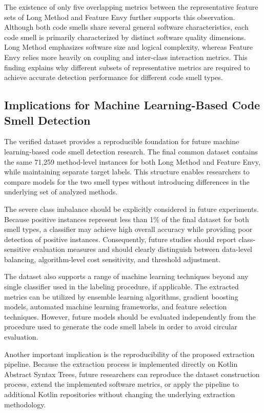 \documentclass[]{einformatica}
\begin{document}
The existence of only five overlapping metrics between the representative feature sets of Long Method and Feature Envy further supports this observation. Although both code smells share several general software characteristics, each code smell is primarily characterized by distinct software quality dimensions. Long Method emphasizes software size and logical complexity, whereas Feature Envy relies more heavily on coupling and inter-class interaction metrics. This finding explains why different subsets of representative metrics are required to achieve accurate detection performance for different code smell types.

\subsection{Implications for Machine Learning-Based Code Smell Detection}

The verified dataset provides a reproducible foundation for future machine learning-based code smell detection research. The final common dataset contains the same 71,259 method-level instances for both Long Method and Feature Envy, while maintaining separate target labels. This structure enables researchers to compare models for the two smell types without introducing differences in the underlying set of analyzed methods.

The severe class imbalance should be explicitly considered in future experiments. Because positive instances represent less than 1\% of the final dataset for both smell types, a classifier may achieve high overall accuracy while providing poor detection of positive instances. Consequently, future studies should report class-sensitive evaluation measures and should clearly distinguish between data-level balancing, algorithm-level cost sensitivity, and threshold adjustment.

The dataset also supports a range of machine learning techniques beyond any single classifier used in the labeling procedure, if applicable. The extracted metrics can be utilized by ensemble learning algorithms, gradient boosting models, automated machine learning frameworks, and feature selection techniques. However, future models should be evaluated independently from the procedure used to generate the code smell labels in order to avoid circular evaluation.

Another important implication is the reproducibility of the proposed extraction pipeline. Because the extraction process is implemented directly on Kotlin Abstract Syntax Trees, future researchers can reproduce the dataset construction process, extend the implemented software metrics, or apply the pipeline to additional Kotlin repositories without changing the underlying extraction methodology.
\end{document}
